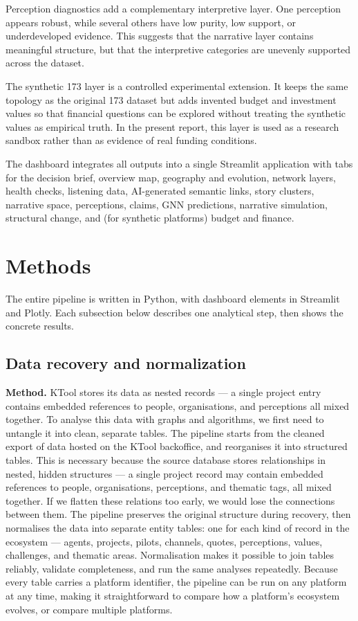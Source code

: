 \documentclass[11pt,a4paper]{article}
\begin{document}
Perception diagnostics add a complementary interpretive layer. One
perception appears robust, while several others have low purity, low
support, or underdeveloped evidence. This suggests that the narrative
layer contains meaningful structure, but that the interpretive
categories are unevenly supported across the dataset.

The synthetic 173 layer is a controlled experimental extension. It keeps
the same topology as the original 173 dataset but adds invented budget
and investment values so that financial questions can be explored
without treating the synthetic values as empirical truth. In the present
report, this layer is used as a research sandbox rather than as evidence
of real funding conditions.

The dashboard integrates all outputs into a single Streamlit
application with tabs for the decision brief, overview map, geography
and evolution, network layers, health checks, listening data,
AI-generated semantic links, story clusters, narrative space,
perceptions, claims, GNN predictions, narrative simulation, structural
change, and (for synthetic platforms) budget and finance.

\section{Methods}

The entire pipeline is written in Python, with dashboard elements in
Streamlit and Plotly. Each subsection below describes one analytical
step, then shows the concrete results.

\subsection{Data recovery and normalization}

\textbf{Method.} KTool stores its data as nested records — a single project
entry contains embedded references to people, organisations, and
perceptions all mixed together. To analyse this data with graphs and
algorithms, we first need to untangle it into clean, separate tables.
The pipeline starts from the cleaned export of data hosted on the KTool
backoffice, and reorganises it into structured tables. This is necessary
because the source database stores relationships in nested,
hidden structures — a single project record may contain embedded
references to people, organisations, perceptions, and thematic tags, all
mixed together. If we flatten these relations too early, we would lose
the connections between them. The pipeline preserves the original
structure during recovery, then normalises the data into separate entity
tables: one for each kind of record in the ecosystem — agents, projects,
pilots, channels, quotes, perceptions, values, challenges, and thematic
areas. Normalisation makes it possible to join tables reliably, validate
completeness, and run the same analyses repeatedly. Because every table
carries a platform identifier, the pipeline can be run on any platform
at any time, making it straightforward to compare how a platform's
ecosystem evolves, or compare multiple platforms.
\end{document}
